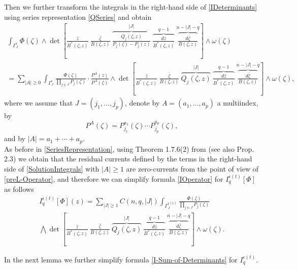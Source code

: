 \documentclass[11pt,reqno]{amsart}
\numberwithin{equation}{section}
\begin{document}
\indent
Then we further transform the integrals in the right-hand side of \eqref{IDeterminants}
using series representation \eqref{QSeries}
and obtain
\begin{multline}\label{SolutionIntegrals}
\int_{\Gamma^{\epsilon}_J}\Phi(\zeta)
\wedge\det\left[\frac{\bar z}{B^*(\zeta,z)}\ \frac{\bar\zeta}{B(\zeta,z)}\
\overbrace{\frac{Q_j(\zeta,z)}{P_j(\zeta)-P_j(z)}}^{|J|}\
\overbrace{\frac{d{\bar z}}{B^*(\zeta,z)}}^{q-1}\
\overbrace{\frac{d{\bar\zeta}}{B(\zeta,z)}}^{n-|J|-q}\right]
\wedge\omega(\zeta)\\
=\sum_{|A|\geq 0}
\int_{\Gamma^{\epsilon}_J}
\frac{\Phi(\zeta)}{\prod_{j\in J}P_j(\zeta)}
\cdot\frac{P^A(z)}{P^A(\zeta)}
\wedge\det\left[\frac{\bar z}{B^*(\zeta,z)}\ \frac{\bar\zeta}{B(\zeta,z)}\
\overbrace{Q_j(\zeta,z)}^{|J|}\
\overbrace{\frac{d{\bar z}}{B^*(\zeta,z)}}^{q-1}\
\overbrace{\frac{d{\bar\zeta}}{B(\zeta,z)}}^{n-|J|-q}\right]\wedge\omega(\zeta),
\end{multline}
where we assume that $J=(j_1,\dots,j_p)$, denote by $A=(a_1,\dots,a_p)$ a multiindex, by
$$P^A(\zeta)=P_{j_1}^{a_1}(\zeta)\cdots P_{j_p}^{a_p}(\zeta),$$
and by $|A|=a_1+\cdots+a_p$.\\
\indent
As before in \eqref{SeriesRepresentation}, using Theorem 1.7.6(2) from \cite{CH} (see also \cite{HP3} Prop. 2.3)
we obtain that the residual currents defined by the terms
in the right-hand side of \eqref{SolutionIntegrals} with $|A|\geq 1$
are zero-currents from the point of view of \eqref{preL-Operator}, and therefore
we can simplify formula \eqref{IOperator} for $I_q^{\epsilon(t)}\left[\Phi\right]$ as follows
\begin{multline}\label{I-Sum-of-Determinants}
I_q^{\epsilon(t)}\left[\Phi\right](z)
=\sum_{|J|\geq 1}C(n,q,|J|)\int_{\Gamma^{\epsilon(t)}_J}
\frac{\Phi(\zeta)}{\prod_{j\in J}P_j(\zeta)}\\
\bigwedge\det\left[\frac{\bar z}{B^*(\zeta,z)}\ \frac{\bar\zeta}{B(\zeta,z)}\
\overbrace{Q_j(\zeta,z)}^{|J|}\
\overbrace{\frac{d{\bar z}}{B^*(\zeta,z)}}^{q-1}\
\overbrace{\frac{d{\bar\zeta}}{B(\zeta,z)}}^{n-|J|-q}\right]\wedge\omega(\zeta).
\end{multline}

\indent
In the next lemma we further simplify formula \eqref{I-Sum-of-Determinants} for $I_q^{\epsilon(t)}$.
\end{document}
